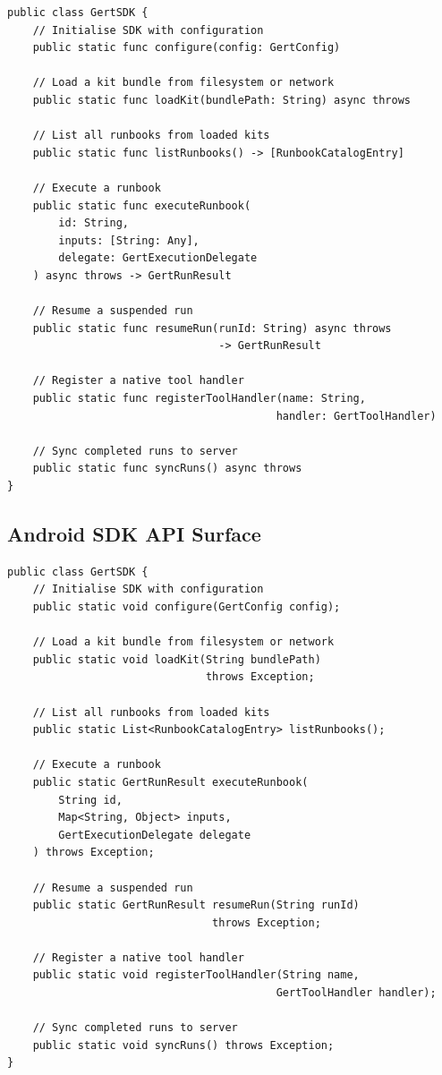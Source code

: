 \begin{verbatim}
public class GertSDK {
    // Initialise SDK with configuration
    public static func configure(config: GertConfig)
    
    // Load a kit bundle from filesystem or network
    public static func loadKit(bundlePath: String) async throws
    
    // List all runbooks from loaded kits
    public static func listRunbooks() -> [RunbookCatalogEntry]
    
    // Execute a runbook
    public static func executeRunbook(
        id: String, 
        inputs: [String: Any],
        delegate: GertExecutionDelegate
    ) async throws -> GertRunResult
    
    // Resume a suspended run
    public static func resumeRun(runId: String) async throws 
                                 -> GertRunResult
    
    // Register a native tool handler
    public static func registerToolHandler(name: String, 
                                          handler: GertToolHandler)
    
    // Sync completed runs to server
    public static func syncRuns() async throws
}
\end{verbatim}

\subsection{Android SDK API Surface}

\begin{verbatim}
public class GertSDK {
    // Initialise SDK with configuration
    public static void configure(GertConfig config);
    
    // Load a kit bundle from filesystem or network
    public static void loadKit(String bundlePath) 
                               throws Exception;
    
    // List all runbooks from loaded kits
    public static List<RunbookCatalogEntry> listRunbooks();
    
    // Execute a runbook
    public static GertRunResult executeRunbook(
        String id, 
        Map<String, Object> inputs,
        GertExecutionDelegate delegate
    ) throws Exception;
    
    // Resume a suspended run
    public static GertRunResult resumeRun(String runId) 
                                throws Exception;
    
    // Register a native tool handler
    public static void registerToolHandler(String name, 
                                          GertToolHandler handler);
    
    // Sync completed runs to server
    public static void syncRuns() throws Exception;
}
\end{verbatim}

